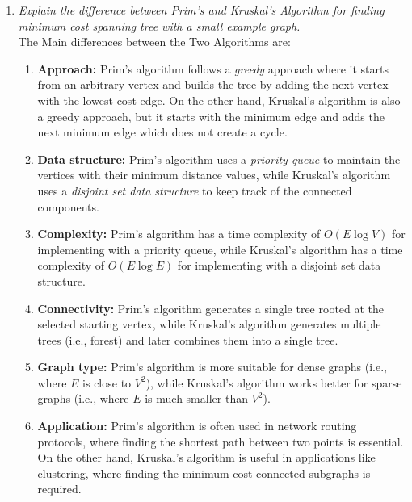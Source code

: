 \documentclass[11pt]{article}
\begin{document}
\begin{enumerate}
    \item \textit{ Explain the difference between Prim's and Kruskal's Algorithm for finding minimum cost spanning tree with a small example graph.}\\

          The Main differences between the Two Algorithms are:
          \begin{enumerate}
              \item \textbf{Approach:} Prim's algorithm follows a \textit{greedy} approach where it starts from an arbitrary vertex and builds the tree by adding the next vertex with the lowest cost edge. On the other hand, Kruskal's algorithm is also a greedy approach, but it starts with the minimum edge and adds the next minimum edge which does not create a cycle.

              \item \textbf{Data structure:} Prim's algorithm uses a \textit{priority queue} to maintain the vertices with their minimum distance values, while Kruskal's algorithm uses a \textit{disjoint set data structure} to keep track of the connected components.

              \item \textbf{Complexity:} Prim's algorithm has a time complexity of $O(E\log V)$ for implementing with a priority queue, while Kruskal's algorithm has a time complexity of $O(E\log E)$ for implementing with a disjoint set data structure.

              \item \textbf{Connectivity:} Prim's algorithm generates a single tree rooted at the selected starting vertex, while Kruskal's algorithm generates multiple trees (i.e., forest) and later combines them into a single tree.

              \item \textbf{Graph type:} Prim's algorithm is more suitable for dense graphs (i.e., where $E$ is close to $V^2$), while Kruskal's algorithm works better for sparse graphs (i.e., where $E$ is much smaller than $V^2$).

              \item \textbf{Application:} Prim's algorithm is often used in network routing protocols, where finding the shortest path between two points is essential. On the other hand, Kruskal's algorithm is useful in applications like clustering, where finding the minimum cost connected subgraphs is required.


\end{enumerate}
\end{enumerate}
\end{document}
